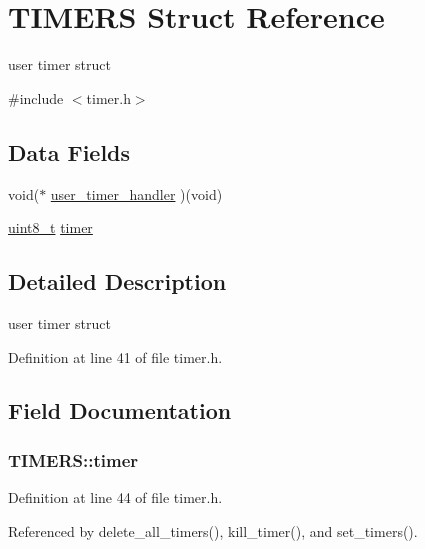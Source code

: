 \hypertarget{structTIMERS}{}\section{T\+I\+M\+E\+RS Struct Reference}
\label{structTIMERS}


user timer struct  




{\ttfamily \#include $<$timer.\+h$>$}

\subsection*{Data Fields}
\begin{DoxyCompactItemize}
\item 
void($\ast$ \hyperlink{structTIMERS_a4326e05ca52d80147efafd0d246ecb41}{user\+\_\+timer\+\_\+handler} )(void)
\item 
\hyperlink{send_8c_aba7bc1797add20fe3efdf37ced1182c5}{uint8\+\_\+t} \hyperlink{structTIMERS_a0b10fdb7b0e6b1d3ca49718f47c4514d}{timer}
\end{DoxyCompactItemize}


\subsection{Detailed Description}
user timer struct 

Definition at line 41 of file timer.\+h.



\subsection{Field Documentation}
\subsubsection[{\texorpdfstring{timer}{timer}}]{ T\+I\+M\+E\+R\+S\+::timer}\hypertarget{structTIMERS_a0b10fdb7b0e6b1d3ca49718f47c4514d}{}\label{structTIMERS_a0b10fdb7b0e6b1d3ca49718f47c4514d}


Definition at line 44 of file timer.\+h.



Referenced by delete\+\_\+all\+\_\+timers(), kill\+\_\+timer(), and set\+\_\+timers().

